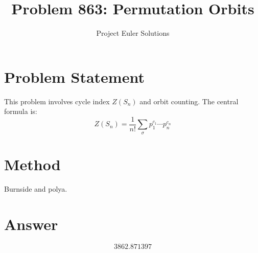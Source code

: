 \documentclass[11pt]{article}
\title{Problem 863: Permutation Orbits}
\author{Project Euler Solutions}
\date{}
\begin{document}
\maketitle
\section{Problem Statement}
This problem involves cycle index $Z(S_n)$ and orbit counting. The central formula is:
\[
Z(S_n) = \frac{1}{n!}\sum_{\sigma}p_1^{c_1}\cdots p_n^{c_n}
\]
\section{Method}
Burnside and polya.
\section{Answer}

\[
\boxed{3862.871397}
\]
\end{document}
